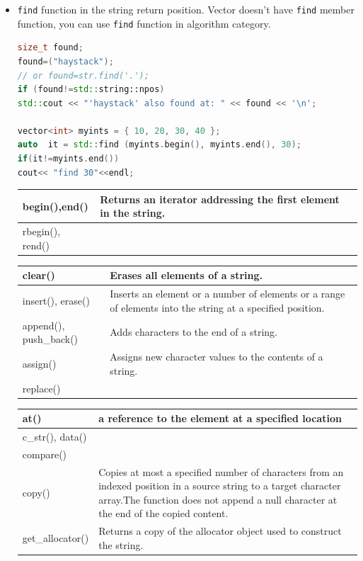 \documentclass[a4paper,11pt,twoside]{book}
\newcommand{\tophline}{\hline }
\newcommand{\bottomhline}{\\ \hline }
\newcommand{\tophline}{ }
\newcommand{\bottomhline}{ }
\begin{document}
\begin{itemize}
	\item \texttt{find} function in the string return position. Vector doesn't have \texttt{find} member function, you can use \texttt{find} function in  algorithm category.
	
\begin{lstlisting}[frame=single, language=c++]
size_t found;
found=("haystack");
// or found=str.find('.');
if (found!=std::string::npos)
std::cout << "'haystack' also found at: " << found << '\n';
	
vector<int> myints = { 10, 20, 30, 40 };
auto  it = std::find (myints.begin(), myints.end(), 30);
if(it!=myints.end())
cout<< "find 30"<<endl;
\end{lstlisting}
	
	
	\begin{tabular}{| p{} |p{}|}
		\tophline
		begin(),end() & Returns an iterator addressing the first element in the string.\\
		\tophline
		rbegin(), rend() & \bottomhline
		
	\end{tabular}
	
	
	\begin{tabular}{| p{} |p{}|}
		\tophline
		clear()& Erases all elements of a string.\\
		\tophline
		insert(), erase() & Inserts an element or a number of elements or a range of elements into the string at a specified position.\\
		\tophline
		append(), push\_back() & Adds characters to the end of a string.\\
		\tophline
		assign() &Assigns new character values to the contents of a string.\\
		\tophline
		replace() & \bottomhline
	\end{tabular}
	
	\begin{tabular}{| p{} |p{}|}
		
		\tophline
		at() & a reference to the element at a specified location \\
		\tophline
		c\_str(), data() & \\
		\tophline
		compare()& \\
		\tophline
		copy() & Copies at most a specified number of characters from an indexed position in a source string to a target character array.The function does not append a null character at the end of the copied content.
		\\
		\tophline
		get\_allocator() & Returns a copy of the allocator object used to construct the string.\\
		

\end{tabular}
\end{itemize}
\end{document}
